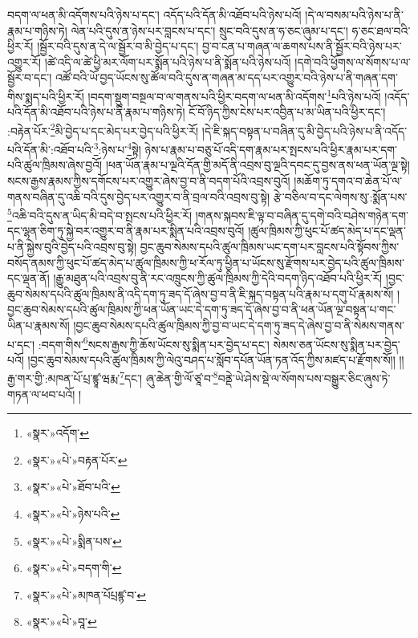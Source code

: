བདག་ལ་ཕན་མི་འདོགས་པའི་ཉེས་པ་དང་། འདོད་པའི་དོན་མི་འཐོབ་པའི་ཉེས་པའོ། །དེ་ལ་བསམ་པའི་ཉེས་པ་ནི་རྣམ་པ་གཉིས་ཏེ། ལེན་པའི་དུས་ན་ཉེས་པར་བླངས་པ་དང་། སྲུང་བའི་དུས་ན་ཧ་ཅང་ཞུམ་པ་དང་། ཧ་ཅང་ཐལ་བའི་ཕྱིར་རོ། །སྦྱོར་བའི་དུས་ན་དེ་ལ་སྦྱོར་བ་མི་བྱེད་པ་དང་། བྱ་བ་ངན་པ་གཞན་ལ་ཆགས་པས་ནི་སྦྱོར་བའི་ཉེས་པར་འགྱུར་རོ། །ཚེ་འདི་ལ་ཚེ་ཕྱི་མར་ལོག་པར་སྨོན་པའི་ཉེས་པ་ནི་སྨོན་པའི་ཉེས་པའོ། །དགེ་བའི་ཕྱོགས་ལ་སོགས་པ་ལ་སྦྱོར་བ་དང་། འཚོ་བའི་ཡོ་བྱད་ཡོངས་སུ་ཚོལ་བའི་དུས་ན་གཞན་མ་དད་པར་འགྱུར་བའི་ཉེས་པ་ནི་གཞན་དག་གིས་སྨད་པའི་ཕྱིར་རོ། །བདག་སྡུག་བསྔལ་བ་ལ་གནས་པའི་ཕྱིར་བདག་ལ་ཕན་མི་འདོགས་\footnote{«སྣར་»འདོག་}པའི་ཉེས་པའོ། །འདོད་པའི་དོན་མི་འཐོབ་པའི་ཉེས་པ་ནི་རྣམ་པ་གཉིས་ཏེ། ངོ་བོ་ཉིད་ཀྱིས་ངེས་པར་འབྱིན་པ་མ་ཡིན་པའི་ཕྱིར་དང་། :བརྟེན་པོར་\footnote{«སྣར་»«པེ་»བརྟན་པོར་}མི་བྱེད་པ་དང་མེད་པར་བྱེད་པའི་ཕྱིར་རོ། །དེ་ཇི་སྐད་བསྟན་པ་བཞིན་དུ་མི་བྱེད་པའི་ཉེས་པ་ནི་འདོད་པའི་དོན་མི་:འཐོབ་པའི་\footnote{«སྣར་»«པེ་»ཐོབ་པའི་}:ཉེས་པ་\footnote{«སྣར་»«པེ་»ཉེས་པའི་}སྟེ། ཉེས་པ་རྣམ་པ་བཅུ་པོ་འདི་དག་རྣམ་པར་སྤངས་པའི་ཕྱིར་རྣམ་པར་དག་པའི་ཚུལ་ཁྲིམས་ཞེས་བྱའོ། །ཕན་ཡོན་རྣམ་པ་ལྔའི་དོན་གྱི་མདོ་ནི་འབྲས་བུ་ལྔའི་དབང་དུ་བྱས་ནས་ཕན་ཡོན་ལྔ་སྟེ། སངས་རྒྱས་རྣམས་ཀྱིས་དགོངས་པར་འགྱུར་ཞེས་བྱ་བ་ནི་བདག་པོའི་འབྲས་བུའོ། །མཆོག་ཏུ་དགའ་བ་ཆེན་པོ་ལ་གནས་བཞིན་དུ་འཆི་བའི་དུས་བྱེད་པར་འགྱུར་བ་ནི་བྲལ་བའི་འབྲས་བུ་སྟེ། རྩེ་བཅིལ་བ་དང་ལེགས་སུ་:སྨོན་པས་\footnote{«སྣར་»«པེ་»སྨིན་པས་}འཆི་བའི་དུས་ན་ཡིད་མི་བདེ་བ་སྤངས་པའི་ཕྱིར་རོ། །གནས་སྐབས་ཇི་ལྟ་བ་བཞིན་དུ་དགེ་བའི་བཤེས་གཉེན་དག་དང་ལྷན་ཅིག་ཏུ་སྐྱེ་བར་འགྱུར་བ་ནི་རྣམ་པར་སྨིན་པའི་འབྲས་བུའོ། །ཚུལ་ཁྲིམས་ཀྱི་ཕུང་པོ་ཚད་མེད་པ་དང་ལྡན་པ་ནི་སྐྱེས་བུའི་བྱེད་པའི་འབྲས་བུ་སྟེ། བྱང་ཆུབ་སེམས་དཔའི་ཚུལ་ཁྲིམས་ཡང་དག་པར་བླངས་པའི་སྟོབས་ཀྱིས་བསོད་ནམས་ཀྱི་ཕུང་པོ་ཚད་མེད་པ་ཚུལ་ཁྲིམས་ཀྱི་ཕ་རོལ་ཏུ་ཕྱིན་པ་ཡོངས་སུ་རྫོགས་པར་བྱེད་པའི་ཚུལ་ཁྲིམས་དང་ལྡན་ནོ། །རྒྱུ་མཐུན་པའི་འབྲས་བུ་ནི་རང་འཁྲུངས་ཀྱི་ཚུལ་ཁྲིམས་ཀྱི་དེའི་བདག་ཉིད་འཐོབ་པའི་ཕྱིར་རོ། །བྱང་ཆུབ་སེམས་དཔའི་ཚུལ་ཁྲིམས་ནི་འདི་དག་ཏུ་ཟད་དོ་ཞེས་བྱ་བ་ནི་ཇི་སྐད་བསྟན་པའི་རྣམ་པ་དགུ་པོ་རྣམས་སོ། །བྱང་ཆུབ་སེམས་དཔའི་ཚུལ་ཁྲིམས་ཀྱི་ཕན་ཡོན་ཡང་དེ་དག་ཏུ་ཟད་དོ་ཞེས་བྱ་བ་ནི་ཕན་ཡོན་ལྔ་བསྟན་པ་གང་ཡིན་པ་རྣམས་སོ། །བྱང་ཆུབ་སེམས་དཔའི་ཚུལ་ཁྲིམས་ཀྱི་བྱ་བ་ཡང་དེ་དག་ཏུ་ཟད་དེ་ཞེས་བྱ་བ་ནི་སེམས་གནས་པ་དང་། :བདག་གིས་\footnote{«སྣར་»«པེ་»བདག་གི་}སངས་རྒྱས་ཀྱི་ཆོས་ཡོངས་སུ་སྨིན་པར་བྱེད་པ་དང་། སེམས་ཅན་ཡོངས་སུ་སྨིན་པར་བྱེད་པའོ། །བྱང་ཆུབ་སེམས་དཔའི་ཚུལ་ཁྲིམས་ཀྱི་ལེའུ་བཤད་པ་སློབ་དཔོན་ཡོན་ཏན་འོད་ཀྱིས་མཛད་པ་རྫོགས་སོ།། །།རྒྱ་གར་གྱི་:མཁན་པོ་པྲ་ཛྙཱ་ཝརྨ་\footnote{«སྣར་»«པེ་»མཁན་པོཔྲཛྙ་བ་}དང་། ཞུ་ཆེན་གྱི་ལོ་ཙཱ་བ་\footnote{«སྣར་»«པེ་»བཱ་}བནྡེ་ཡེ་ཤེས་སྡེ་ལ་སོགས་པས་བསྒྱུར་ཅིང་ཞུས་ཏེ་གཏན་ལ་ཕབ་པའོ། ། 